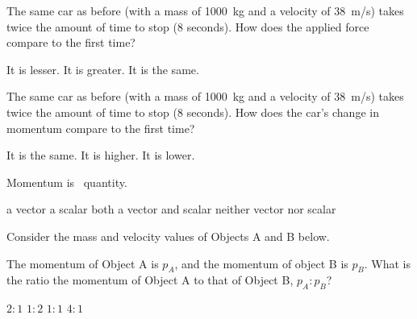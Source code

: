 \documentclass[]{exam}
\begin{document}
\begin{questions}
\question
The same car as before (with a mass of \SI{1000}{kg} and a velocity of \SI{38}{m/s}) takes twice the amount of time to stop (8 seconds). How does the applied force compare to the first time? 

\begin{randomizechoices}
    \correctchoice It is lesser.
    \choice It is greater.
    \choice It is the same.
\end{randomizechoices}

\question
The same car as before (with a mass of \SI{1000}{kg} and a velocity of \SI{38}{m/s}) takes twice the amount of time to stop (8 seconds). How does the car’s change in momentum compare to the first time? 

\begin{randomizechoices}
    \correctchoice It is the same.
    \choice It is higher.
    \choice It is lower.
\end{randomizechoices}

\question
Momentum is \fillin[a vector][4cm]\ quantity.

\begin{randomizechoices}[norandomize]
    \correctchoice a vector
    \choice a scalar
    \choice both a vector and scalar
    \choice neither vector nor scalar
\end{randomizechoices}

\question
Consider the mass and velocity values of Objects A and B below.

\begin{center}
\end{center}

The momentum of Object A is $p_A$, and the momentum of object B is $p_B$. What is the ratio the momentum of Object A to that of Object B, $p_A : p_B$?

\begin{randomizechoices}
    \correctchoice $2:1$
    \choice $1:2$
    \choice $1:1$
    \choice $4:1$
\end{randomizechoices}
\end{questions}

\clearpage
\end{document}
